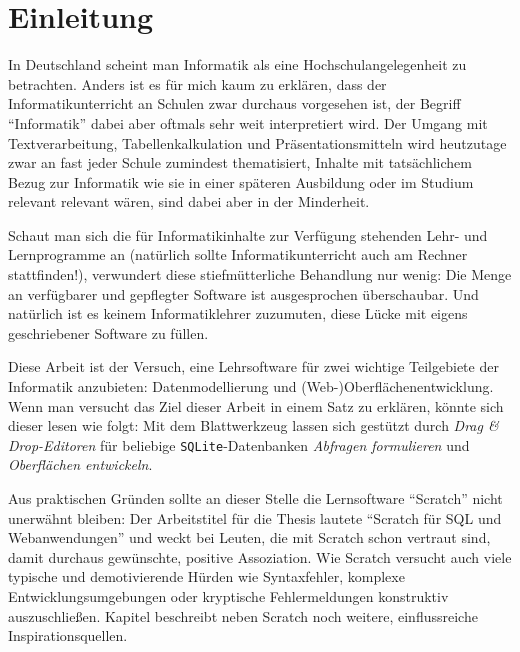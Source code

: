 \section{Einleitung}
\label{sec:introduction}

In Deutschland scheint man Informatik als eine Hochschulangelegenheit zu betrachten. Anders ist es für mich kaum zu erklären, dass der Informatikunterricht an Schulen zwar durchaus vorgesehen ist, der Begriff ``Informatik'' dabei aber oftmals sehr weit interpretiert wird. Der Umgang mit Textverarbeitung, Tabellenkalkulation und Präsentationsmitteln wird heutzutage zwar an fast jeder Schule zumindest thematisiert, Inhalte mit tatsächlichem Bezug zur Informatik wie sie in einer späteren Ausbildung oder im Studium relevant relevant wären, sind dabei aber in der Minderheit.

Schaut man sich die für Informatikinhalte zur Verfügung stehenden Lehr- und Lernprogramme an (natürlich sollte Informatikunterricht auch am Rechner stattfinden!), verwundert diese stiefmütterliche Behandlung nur wenig: Die Menge an verfügbarer und gepflegter Software ist ausgesprochen überschaubar. Und natürlich ist es keinem Informatiklehrer zuzumuten, diese Lücke mit eigens geschriebener Software zu füllen.

Diese Arbeit ist der Versuch, eine Lehrsoftware für zwei wichtige Teilgebiete der Informatik anzubieten: Datenmodellierung und (Web-)Oberflächenentwicklung. Wenn man versucht das Ziel dieser Arbeit in einem Satz zu erklären, könnte sich dieser lesen wie folgt: Mit dem Blattwerkzeug lassen sich gestützt durch \textit{Drag \& Drop-Editoren} für beliebige \texttt{SQLite}-Datenbanken \textit{Abfragen formulieren} und \textit{Oberflächen entwickeln}.


Aus praktischen Gründen sollte an dieser Stelle die Lernsoftware "`Scratch"' nicht unerwähnt bleiben: Der Arbeitstitel für die Thesis lautete "`Scratch für SQL und Webanwendungen"' und weckt bei Leuten, die mit Scratch schon vertraut sind, damit durchaus gewünschte, positive Assoziation. Wie Scratch versucht auch \idename{} viele typische und demotivierende Hürden wie Syntaxfehler, komplexe Entwicklungsumgebungen oder kryptische Fehlermeldungen konstruktiv auszuschließen. Kapitel  beschreibt neben Scratch noch weitere, einflussreiche Inspirationsquellen.

